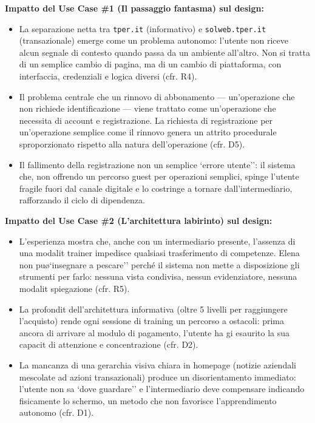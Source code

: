 \documentclass[11pt,a4paper]{article}
\begin{document}
\vspace{0.3cm}

\begin{tcolorbox}[colback=backgroundColor,colframe=borderColor,arc=2mm]
    {\small
    \textbf{Impatto del Use Case \#1 (Il passaggio fantasma) sul design:} \\[4pt]
    \begin{itemize}[leftmargin=*]
        \item La separazione netta tra \texttt{tper.it} (informativo) e \texttt{solweb.tper.it} (transazionale) emerge come un problema autonomo: l'utente non riceve alcun segnale di contesto quando passa da un ambiente all'altro. Non si tratta di un semplice cambio di pagina, ma di un cambio di piattaforma, con interfaccia, credenziali e logica diversi (cfr. R4).
        \item Il problema centrale \e che un rinnovo di abbonamento — un'operazione che non richiede identificazione — viene trattato come un'operazione che necessita di account e registrazione. La richiesta di registrazione per un'operazione semplice come il rinnovo genera un attrito procedurale sproporzionato rispetto alla natura dell'operazione (cfr. D5).
        \item Il fallimento della registrazione non \e un semplice `errore utente'': \e il sistema che, non offrendo un percorso guest per operazioni semplici, spinge l'utente fragile fuori dal canale digitale e lo costringe a tornare dall'intermediario, rafforzando il ciclo di dipendenza.
    \end{itemize}
    \vspace{0.2cm}
    \textbf{Impatto del Use Case \#2 (L'architettura labirinto) sul design:} \\[4pt]
    \begin{itemize}[leftmargin=*]
        \item L'esperienza mostra che, anche con un intermediario presente, l'assenza di una modalit\ trainer impedisce qualsiasi trasferimento di competenze. Elena non pu\o `insegnare a pescare'' perch\'e il sistema non mette a disposizione gli strumenti per farlo: nessuna vista condivisa, nessun evidenziatore, nessuna modalit\ spiegazione (cfr. R5).
        \item La profondit\ dell'architettura informativa (oltre 5 livelli per raggiungere l'acquisto) rende ogni sessione di training un percorso a ostacoli: prima ancora di arrivare al modulo di pagamento, l'utente ha gi\ esaurito la sua capacit\ di attenzione e concentrazione (cfr. D2).
        \item La mancanza di una gerarchia visiva chiara in homepage (notizie aziendali mescolate ad azioni transazionali) produce un disorientamento immediato: l'utente non sa `dove guardare'' e l'intermediario deve compensare indicando fisicamente lo schermo, un metodo che non favorisce l'apprendimento autonomo (cfr. D1).
    \end{itemize}
    }
\end{tcolorbox}
\end{document}
